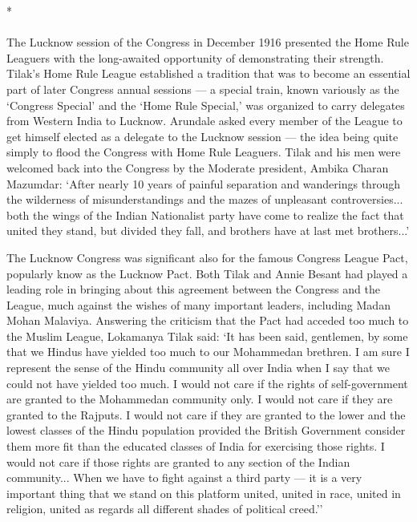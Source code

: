 \begin{center}*\end{center}

\paragraph*{}

The Lucknow session of the Congress in December 1916 presented the Home Rule Leaguers with the long-awaited opportunity of demonstrating their strength. Tilak's Home Rule League established a tradition that was to become an essential part of later Congress annual sessions --- a special train, known variously as the `Congress Special' and the `Home Rule Special,' was organized to carry delegates from Western India to Lucknow. Arundale asked every member of the League to get himself elected as a delegate to the Lucknow session --- the idea being quite simply to flood the Congress with Home Rule Leaguers. Tilak and his men were welcomed back into the Congress by the Moderate president, Ambika Charan Mazumdar: `After nearly 10 years of painful separation and wanderings through the wilderness of misunderstandings and the mazes of unpleasant controversies... both the wings of the Indian Nationalist party have come to realize the fact that united they stand, but divided they fall, and brothers have at last met brothers...'

The Lucknow Congress was significant also for the famous Congress League Pact, popularly know as the Lucknow Pact. Both Tilak and Annie Besant had played a leading role in bringing about this agreement between the Congress and the League, much against the wishes of many important leaders, including Madan Mohan Malaviya. Answering the criticism that the Pact had acceded too much to the Muslim League, Lokamanya Tilak said: `It has been said, gentlemen, by some that we Hindus have yielded too much to our Mohammedan brethren. I am sure I represent the sense of the Hindu community all over India when I say that we could not have yielded too much. I would not care if the rights of self-government are granted to the Mohammedan community only. I would not care if they are granted to the Rajputs. I would not care if they are granted to the lower and the lowest classes of the Hindu population provided the British Government consider them more fit than the educated classes of India for exercising those rights. I would not care if those rights are granted to any section of the Indian community... When we have to fight against a third party --- it is a very important thing that we stand on this platform united, united in race, united in religion, united as regards all different shades of political creed.''

